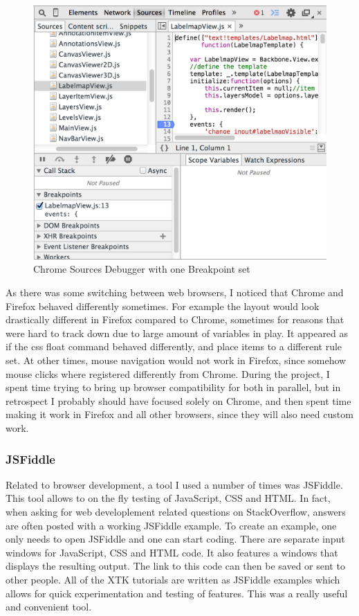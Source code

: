 \documentclass[a4paper,11pt,twoside]{article}
\begin{document}
\begin{figure}[ht!]
\centering
\includegraphics[width=140mm]{graphics/chromeDebugger_01.png}
\caption{Chrome Sources Debugger with one Breakpoint set}
\label{fig:UIdesign1}
\end{figure}



As there was some switching between web browsers, I noticed that Chrome and Firefox behaved differently sometimes. For example the layout would look drastically different in Firefox compared to Chrome, sometimes for reasons that were hard to track down due to large amount of variables in play. It appeared as if the css float command behaved differently, and place items to a different rule set. At other times, mouse navigation would not work in Firefox, since somehow mouse clicks where registered differently from Chrome. During the project, I spent time trying to bring up browser compatibility for both in parallel, but in retrospect I probably should have focused solely on Chrome, and then spent time making it work in Firefox and all other browsers, since they will also need custom work.


\subsubsection{JSFiddle}

Related to browser development, a tool I used a number of times was JSFiddle. This tool allows to on the fly testing of JavaScript, CSS and HTML. In fact, when asking for web developlement related questions on StackOverflow, answers are often posted with a working JSFiddle example. To create an example, one only needs to open JSFiddle and one can start coding. There are separate input windows for JavaScript, CSS and HTML code. It also features a windows that displays the resulting output. The link to this code can then be saved or sent to other people. All of the XTK tutorials are written as JSFiddle examples which allows for quick experimentation and testing of features. This was a really useful and convenient tool. 
\end{document}
